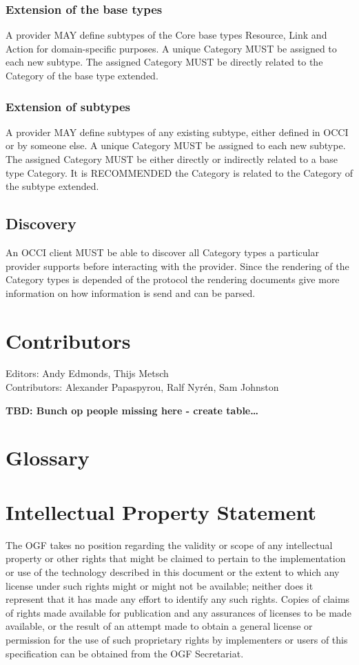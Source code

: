 \documentclass[10pt,a4paper,british]{article}
\begin{document}
\subsubsection{Extension of the base types}
A provider MAY define subtypes of the Core base types Resource, Link
and Action for domain-specific purposes. A unique Category MUST be
assigned to each new subtype. The assigned Category MUST be directly
related to the Category of the base type extended.

\subsubsection{Extension of subtypes}
A provider MAY define subtypes of any existing subtype, either defined
in OCCI or by someone else. A unique Category MUST be assigned to each
new subtype. The assigned Category MUST be either directly or
indirectly related to a base type Category. It is RECOMMENDED the
Category is related to the Category of the subtype extended.

\subsection{Discovery}
An OCCI client MUST be able to discover all Category types a
particular provider supports before interacting with the
provider. Since the rendering of the Category types is depended of the
protocol the rendering documents give more information on how
information is send and can be parsed.

\section{Contributors}
Editors: Andy Edmonds, Thijs Metsch \\
Contributors: Alexander Papaspyrou, Ralf Nyrén, Sam Johnston

\textbf{TBD: Bunch op people missing here - create table\ldots}

\section{Glossary}
\label{sec:glossary}



\section{Intellectual Property Statement}
The OGF takes no position regarding the validity or scope of any
intellectual property or other rights that might be claimed to pertain
to the implementation or use of the technology described in this
document or the extent to which any license under such rights might or
might not be available; neither does it represent that it has made any
effort to identify any such rights. Copies of claims of rights made
available for publication and any assurances of licenses to be made
available, or the result of an attempt made to obtain a general
license or permission for the use of such proprietary rights by
implementers or users of this specification can be obtained from the
OGF Secretariat.
\end{document}
